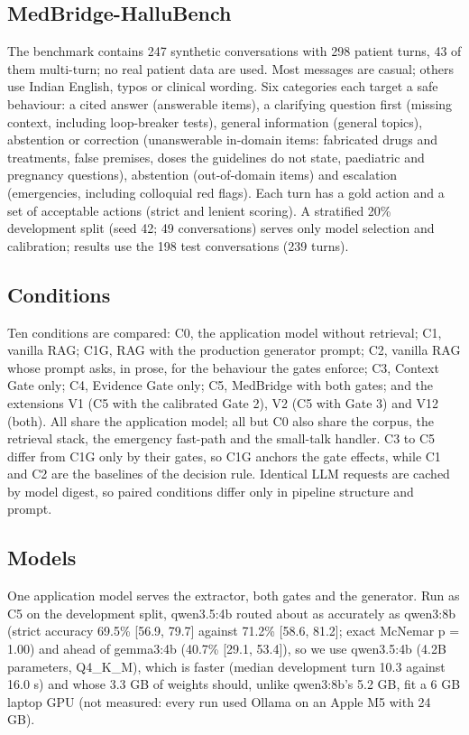 \documentclass[conference]{IEEEtran}
\begin{document}
\subsection{MedBridge-HalluBench}

The benchmark contains 247 synthetic conversations with 298 patient turns, 43 of them multi-turn; no real patient data are used. Most messages are casual; others use Indian English, typos or clinical wording. Six categories each target a safe behaviour: a cited answer (answerable items), a clarifying question first (missing context, including loop-breaker tests), general information (general topics), abstention or correction (unanswerable in-domain items: fabricated drugs and treatments, false premises, doses the guidelines do not state, paediatric and pregnancy questions), abstention (out-of-domain items) and escalation (emergencies, including colloquial red flags). Each turn has a gold action and a set of acceptable actions (strict and lenient scoring). A stratified 20\% development split (seed 42; 49 conversations) serves only model selection and calibration; results use the 198 test conversations (239 turns).

\subsection{Conditions}

Ten conditions are compared: C0, the application model without retrieval; C1, vanilla RAG; C1G, RAG with the production generator prompt; C2, vanilla RAG whose prompt asks, in prose, for the behaviour the gates enforce; C3, Context Gate only; C4, Evidence Gate only; C5, MedBridge with both gates; and the extensions V1 (C5 with the calibrated Gate 2), V2 (C5 with Gate 3) and V12 (both). All share the application model; all but C0 also share the corpus, the retrieval stack, the emergency fast-path and the small-talk handler. C3 to C5 differ from C1G only by their gates, so C1G anchors the gate effects, while C1 and C2 are the baselines of the decision rule. Identical LLM requests are cached by model digest, so paired conditions differ only in pipeline structure and prompt.

\subsection{Models}

One application model serves the extractor, both gates and the generator. Run as C5 on the development split, qwen3.5:4b routed about as accurately as qwen3:8b \cite{yang2025qwen3} (strict accuracy 69.5\% [56.9, 79.7] against 71.2\% [58.6, 81.2]; exact McNemar p = 1.00) and ahead of gemma3:4b \cite{gemmateam2025gemma3} (40.7\% [29.1, 53.4]), so we use qwen3.5:4b (4.2B parameters, Q4\_K\_M), which is faster (median development turn 10.3 against 16.0 s) and whose 3.3 GB of weights should, unlike qwen3:8b's 5.2 GB, fit a 6 GB laptop GPU (not measured: every run used Ollama on an Apple M5 with 24 GB).
\end{document}

